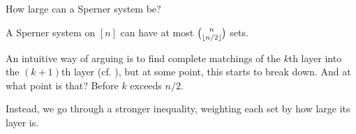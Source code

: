 How large can a Sperner system be?

\begin{boxtheorem} \label{Ch3:Thm:Sperner}
    A Sperner system on $[n]$ can have at most $\binom{n}{\left\lfloor n/2 \right\rfloor}$ sets.
\end{boxtheorem}

An intuitive way of arguing is to find complete matchings of the $k$th layer into the $(k + 1)$th layer (cf. ), but at some point, this starts to break down. And at what point is that? Before $k$ exceeds $n / 2$.

Instead, we go through a stronger inequality, weighting each set by how large its layer is.

